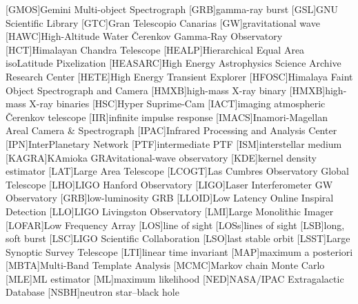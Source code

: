 \begin{acronym}
[GMOS]{Gemini Multi-object Spectrograph}
[GRB]{gamma-ray burst}
[GSL]{GNU Scientific Library}
[GTC]{Gran Telescopio Canarias}
[GW]{gravitational wave}
[HAWC]{High\nobreakdashes-Altitude Water \v{C}erenkov Gamma\nobreakdashes-Ray Observatory}
[HCT]{Himalayan Chandra Telescope}
[HEALP]{Hierarchical Equal Area isoLatitude Pixelization}
[HEASARC]{High Energy Astrophysics Science Archive Research Center}
[HETE]{High Energy Transient Explorer}
[HFOSC]{Himalaya Faint Object Spectrograph and Camera}
[HMXB]{high\nobreakdashes-mass X\nobreakdashes-ray binary}
[HMXB]{high\nobreakdashes-mass X\nobreakdashes-ray binaries}
[HSC]{Hyper Suprime\nobreakdashes-Cam}
[IACT]{imaging atmospheric \v{C}erenkov telescope}
[IIR]{infinite impulse response}
[IMACS]{Inamori-Magellan Areal Camera \& Spectrograph}
[IPAC]{Infrared Processing and Analysis Center}
[IPN]{InterPlanetary Network}
[PTF]{intermediate \acl{PTF}}
[ISM]{interstellar medium}
[KAGRA]{KAmioka GRAvitational\nobreakdashes-wave observatory}
[KDE]{kernel density estimator}
[LAT]{Large Area Telescope}
[LCOGT]{Las Cumbres Observatory Global Telescope}
[LHO]{\ac{LIGO} Hanford Observatory}
[LIGO]{Laser Interferometer \acs{GW} Observatory}
[GRB]{low\nobreakdashes-luminosity \ac{GRB}}
[LLOID]{Low Latency Online Inspiral Detection}
[LLO]{\ac{LIGO} Livingston Observatory}
[LMI]{Large Monolithic Imager}
[LOFAR]{Low Frequency Array}
[LOS]{line of sight}
[LOSs]{lines of sight}
[LSB]{long, soft burst}
[LSC]{\acs{LIGO} Scientific Collaboration}
[LSO]{last stable orbit}
[LSST]{Large Synoptic Survey Telescope}
[LTI]{linear time invariant}
[MAP]{maximum a posteriori}
[MBTA]{Multi-Band Template Analysis}
[MCMC]{Markov chain Monte Carlo}
[MLE]{\ac{ML} estimator}
[ML]{maximum likelihood}
[NED]{NASA/IPAC Extragalactic Database}
[NSBH]{neutron star\nobreakdashes--black hole}

\end{acronym}
